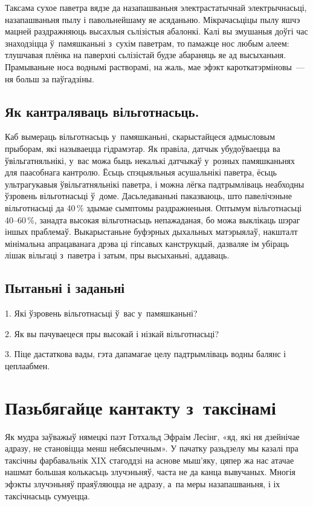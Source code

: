 Таксама сухое паветра вядзе да назапашваньня электрастатычнай электрычнасьці, назапашваньня пылу і павольнейшаму яе асяданьню. Мікрачасьціцы пылу яшчэ мацней раздражняюць высахлыя сьлізістыя абалонкі. Калі вы змушаныя доўгі час знаходзіцца ў~памяшканьні з~сухім паветрам, то памажце нос любым алеем: тлушчавая плёнка на паверхні сьлізістай будзе абараняць яе ад высыханьня. Прамываньне носа воднымі растворамі, на жаль, мае эфэкт кароткатэрміновы~--- ня больш за паўгадзіны.

\subsection*{Як кантраляваць вільготнасьць.}

Каб вымераць вільготнасьць у~памяшканьні, скарыстайцеся адмысловым прыборам, які называецца гідрамэтар. Як правіла, датчык убудоўваецца ва ўвільгатняльнікі, у~вас можа быць некалькі датчыкаў у~розных памяшканьнях для паасобнага кантролю. Ёсьць спэцыяльныя асушальнікі паветра, ёсьць ультрагукавыя ўвільгатняльнікі паветра, і можна лёгка падтрымліваць неабходны ўзровень вільготнасьці ў~доме. Дасьледаваньні паказваюць, што павелічэньне вільготнасьці да 40\,\% здымае сымптомы раздражненьня. Оптымум вільготнасьці 40--60\,\%, занадта высокая вільготнасьць непажаданая, бо можа выклікаць шэраг іншых праблемаў. Выкарыстаньне буфэрных дыхальных матэрыялаў, накшталт мінімальна апрацаванага дрэва ці гіпсавых канструкцый, дазваляе ім убіраць лішак вільгаці з~паветра і затым, пры высыханьні, аддаваць.

\subsection*{Пытаньні і заданьні}

1. Які ўзровень вільготнасьці ў~вас у~памяшканьні?

2. Як вы пачуваецеся пры высокай і нізкай вільготнасьці?

3. Піце дастаткова вады, гэта дапамагае целу падтрымліваць водны балянс і цеплаабмен.


\section{Пазьбягайце кантакту з~таксінамі}

Як мудра заўважыў нямецкі паэт Готхальд Эфраім Лесінг, «яд, які ня дзейнічае адразу, не становіцца менш небясьпечным». У пачатку разьдзелу мы казалі пра таксічны фарбавальнік XIX стагоддзі на аснове мыш'яку, цяпер жа нас атачае нашмат большая колькасьць злучэньняў, часта не да канца вывучаных. Многія эфэкты злучэньняў праяўляюцца не адразу, а~па меры назапашваньня, і іх таксічнасьць сумуецца.

